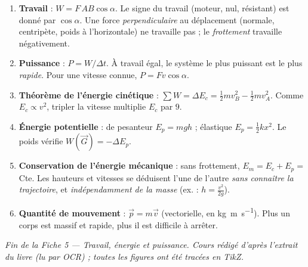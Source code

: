 \documentclass[11pt,a4paper]{article}
\newcommand{\vv}[1]{\vec{#1}}
\begin{document}
\begin{tcolorbox}[boxbase,colback=primary!4,colframe=primary,
   title={\textsc{L'essentiel en six points}}]
\begin{enumerate}[leftmargin=1.7em,topsep=2pt,itemsep=3pt]
  \item \textbf{Travail} : $W=F\,AB\cos\alpha$. Le signe du travail (moteur, nul, résistant) est
        donné par $\cos\alpha$. Une force \emph{perpendiculaire} au déplacement (normale, centripète,
        poids à l'horizontale) ne travaille pas ; le \emph{frottement} travaille négativement.
  \item \textbf{Puissance} : $P=W/\Delta t$. À travail égal, le système le plus puissant est le plus
        \emph{rapide}. Pour une vitesse connue, $P=Fv\cos\alpha$.
  \item \textbf{Théorème de l'énergie cinétique} : $\sum W=\Delta E_c=\tfrac12 m v_B^2-\tfrac12 m v_A^2$.
        Comme $E_c\propto v^2$, tripler la vitesse multiplie $E_c$ par $9$.
  \item \textbf{Énergie potentielle} : de pesanteur $E_p=mgh$ ; élastique $E_p=\tfrac12 k x^2$. Le
        poids vérifie $W(\vv G)=-\Delta E_p$.
  \item \textbf{Conservation de l'énergie mécanique} : sans frottement, $E_m=E_c+E_p=$ Cte. Les
        hauteurs et vitesses se déduisent l'une de l'autre \emph{sans connaître la trajectoire}, et
        \emph{indépendamment de la masse} (ex. : $h=\tfrac{v^2}{2g}$).
  \item \textbf{Quantité de mouvement} : $\vv p=m\vv v$ (vectorielle, en \si{\kilogram\metre\per\second}).
        Plus un corps est massif et rapide, plus il est difficile à arrêter.
\end{enumerate}
\end{tcolorbox}

\vfill
{\small\color{black!55}\itshape Fin de la Fiche 5 — Travail, énergie et puissance. Cours rédigé
d'après l'extrait du livre (lu par OCR) ; toutes les figures ont été tracées en TikZ.}
\end{document}
